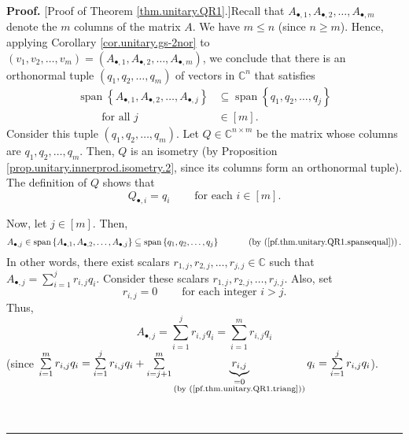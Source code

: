 \documentclass[numbers=enddot,12pt,final,onecolumn,notitlepage]{scrartcl}%
\numberwithin{exer}{subsection}
\theoremstyle{definition}
\newenvironment{proof}[1][Proof]{\noindent\textbf{#1.} }{\ \rule{0.5em}{0.5em}}
\let\sumnonlimits\sum
\renewcommand{\sum}{\sumnonlimits\limits}
\begin{document}
\begin{proof}
[Proof of Theorem \ref{thm.unitary.QR1}.]Recall that $A_{\bullet,1}%
,A_{\bullet,2},\ldots,A_{\bullet,m}$ denote the $m$ columns of the matrix $A$.
We have $m\leq n$ (since $n\geq m$). Hence, applying Corollary
\ref{cor.unitary.gs-2nor} to $\left(  v_{1},v_{2},\ldots,v_{m}\right)
=\left(  A_{\bullet,1},A_{\bullet,2},\ldots,A_{\bullet,m}\right)  $, we
conclude that there is an orthonormal tuple $\left(  q_{1},q_{2},\ldots
,q_{m}\right)  $ of vectors in $\mathbb{C}^{n}$ that satisfies%
\begin{align}
\operatorname*{span}\left\{  A_{\bullet,1},A_{\bullet,2},\ldots,A_{\bullet
,j}\right\}   &  \subseteq\operatorname*{span}\left\{  q_{1},q_{2}%
,\ldots,q_{j}\right\} \label{pf.thm.unitary.QR1.spansequal}\\
\ \ \ \ \ \ \ \ \ \ \text{for all }j  &  \in\left[  m\right]  .\nonumber
\end{align}
Consider this tuple $\left(  q_{1},q_{2},\ldots,q_{m}\right)  $. Let
$Q\in\mathbb{C}^{n\times m}$ be the matrix whose columns are $q_{1}%
,q_{2},\ldots,q_{m}$. Then, $Q$ is an isometry (by Proposition
\ref{prop.unitary.innerprod.isometry.2}, since its columns form an orthonormal
tuple). The definition of $Q$ shows that%
\begin{equation}
Q_{\bullet,i}=q_{i}\ \ \ \ \ \ \ \ \ \ \text{for each }i\in\left[  m\right]  .
\label{pf.thm.unitary.QR1.Qbull}%
\end{equation}


Now, let $j\in\left[  m\right]  $. Then,%
\[
A_{\bullet,j}\in\operatorname*{span}\left\{  A_{\bullet,1},A_{\bullet
,2},\ldots,A_{\bullet,j}\right\}  \subseteq\operatorname*{span}\left\{
q_{1},q_{2},\ldots,q_{j}\right\}  \ \ \ \ \ \ \ \ \ \ \left(  \text{by
(\ref{pf.thm.unitary.QR1.spansequal})}\right)  .
\]
In other words, there exist scalars $r_{1,j},r_{2,j},\ldots,r_{j,j}%
\in\mathbb{C}$ such that $A_{\bullet,j}=\sum_{i=1}^{j}r_{i,j}q_{i}$. Consider
these scalars $r_{1,j},r_{2,j},\ldots,r_{j,j}$. Also, set
\begin{equation}
r_{i,j}=0\ \ \ \ \ \ \ \ \ \ \text{for each integer }i>j.
\label{pf.thm.unitary.QR1.triang}%
\end{equation}
Thus,%
\begin{equation}
A_{\bullet,j}=\sum_{i=1}^{j}r_{i,j}q_{i}=\sum_{i=1}^{m}r_{i,j}q_{i}
\label{pf.thm.unitary.QR1.col=}%
\end{equation}
(since $\sum_{i=1}^{m}r_{i,j}q_{i}=\sum_{i=1}^{j}r_{i,j}q_{i}+\sum_{i=j+1}%
^{m}\underbrace{r_{i,j}}_{\substack{=0\\\text{(by
(\ref{pf.thm.unitary.QR1.triang}))}}}q_{i}=\sum_{i=1}^{j}r_{i,j}q_{i}$).


\end{proof}
\end{document}
